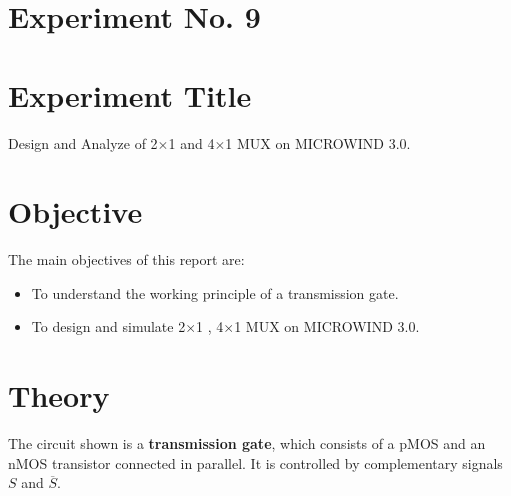 \documentclass[a4paper,12pt]{article}
\begin{document}
	\section{Experiment No. 9}
	
	
	\section{Experiment Title }
	Design and Analyze of 2$\times$1 and 4$\times$1 MUX on MICROWIND 3.0.
	\section{Objective}
	The main objectives of this report are:
	\begin{itemize}
		 \item To understand the working principle of a transmission gate.
		\item To design and simulate 2$\times$1 , 4$\times$1 MUX on MICROWIND 3.0.
	
	\end{itemize}
	\section{Theory}
	
	The circuit shown is a \textbf{transmission gate}, which consists of a pMOS and an nMOS transistor connected in parallel. It is controlled by complementary signals \(S\) and \(\overline{S}\).
	
\end{document}
